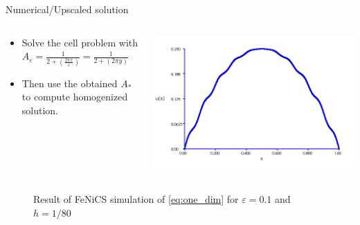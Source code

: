 \documentclass{beamer}
\renewcommand{\epsilon}{\varepsilon}
\begin{document}
\begin{frame}[t]{Numerical/Upscaled solution}
\begin{columns}
    \begin{column}[c]{.5\textwidth}
      \begin{itemize}
      \item Solve the cell problem with $A_{\epsilon}=\frac{1}{2+ \left( \frac{2\pi x}{\epsilon} \right)} = \frac{1}{2+ \left( 2\pi y \right)}$
      \item Then use the obtained $A_{*}$ to compute homogenized solution.
    \end{itemize}
  \end{column}
  \begin{column}[c]{.5\textwidth}

    \includegraphics[width=0.85\linewidth]{one_dim_approx.png}
 \end{column}
\end{columns}
\begin{figure}[ht]
    \centering

    \caption{Result of FeNiCS simulation of \eqref{eq:one_dim} for $\epsilon=0.1$ and $h = 1/80$}
    \label{fig:one_dim_approx}
\end{figure}

\end{frame}
\end{document}
